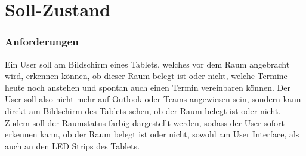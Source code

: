 \pagebreak
\section{Soll-Zustand}\label{sec:soll-zustand}

\subsubsection{Anforderungen}\label{subsec:anforderungen}
Ein User soll am Bildschirm eines Tablets, welches vor dem Raum angebracht wird, erkennen können, ob dieser Raum belegt ist oder nicht, welche Termine heute noch anstehen und spontan auch einen Termin vereinbaren können.
Der User soll also nicht mehr auf Outlook oder Teams angewiesen sein, sondern kann direkt am Bildschirm des Tablets sehen, ob der Raum belegt ist oder nicht.
Zudem soll der Raumstatus farbig dargestellt werden, sodass der User sofort erkennen kann, ob der Raum belegt ist oder nicht, sowohl am User Interface, als auch an den LED Strips des Tablets.

